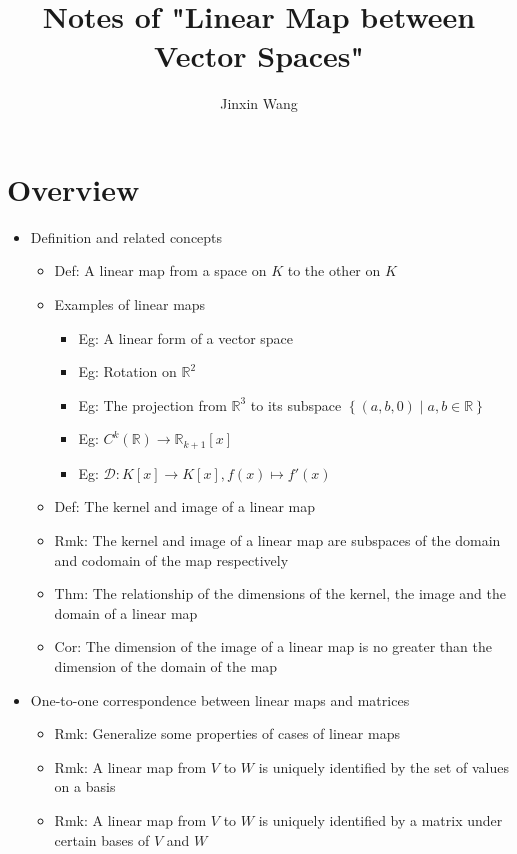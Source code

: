 \documentclass[onecolumn]{ctexart}
\title{Notes of "Linear Map between Vector Spaces"}
\author{Jinxin Wang}
\date{}
\begin{document}
\maketitle

\section{Overview}
\begin{itemize}
  \item Definition and related concepts
  \begin{itemize}
    \item Def: A linear map from a space on $K$ to the other on $K$
    \item Examples of linear maps
    \begin{itemize}
      \item Eg: A linear form of a vector space
      \item Eg: Rotation on $\mathbb{R}^2$
      \item Eg: The projection from $\mathbb{R}^3$ to its subspace $\left\{ (a, b, 0) \mid a, b \in \mathbb{R} \right\}$
      \item Eg: $C^k(\mathbb{R}) \to \mathbb{R}_{k+1}\left[ x \right]$
      \item Eg: $\mathcal{D}: K\left[ x \right] \to K\left[ x \right], f(x) \mapsto f'(x)$
    \end{itemize}
    \item Def: The kernel and image of a linear map
    \item Rmk: The kernel and image of a linear map are subspaces of the domain and codomain of the map respectively
    \item Thm: The relationship of the dimensions of the kernel, the image and the domain of a linear map
    \item Cor: The dimension of the image of a linear map is no greater than the dimension of the domain of the map
  \end{itemize}
  \item One-to-one correspondence between linear maps and matrices
  \begin{itemize}
    \item Rmk: Generalize some properties of cases of linear maps
    \item Rmk: A linear map from $V$ to $W$ is uniquely identified by the set of values on a basis
    \item Rmk: A linear map from $V$ to $W$ is uniquely identified by a matrix under certain bases of $V$ and $W$

\end{itemize}
\end{itemize}
\end{document}
